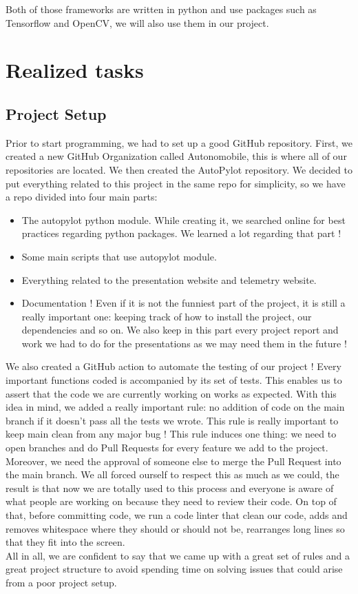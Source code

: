 \documentclass[12pt]{article}
\begin{document}
Both of those frameworks are written in python and use packages such as Tensorflow and OpenCV, we will also use them in our project.
\newpage



\section{Realized tasks}

\subsection{Project Setup}
Prior to start programming, we had to set up a good GitHub repository. First, we created a new GitHub Organization called Autonomobile, this is where all of our repositories are located. We then created the AutoPylot repository. We decided to put everything related to this project in the same repo for simplicity, so we have a repo divided into four main parts:
\begin{itemize}
\item The autopylot python module. While creating it, we searched online for best practices regarding python packages. We learned a lot regarding that part !
\item Some main scripts that use autopylot module.
\item Everything related to the presentation website and telemetry website.
\item Documentation ! Even if it is not the funniest part of the project, it is still a really important one: keeping track of how to install the project, our dependencies and so on. We also keep in this part every project report and work we had to do for the presentations as we may need them in the future !
\end{itemize}
We also created a GitHub action to automate the testing of our project ! Every important functions coded is accompanied by its set of tests. This enables us to assert that the code we are currently working on works as expected. With this idea in mind, we added a really important rule: no addition of code on the main branch if it doesn't pass all the tests we wrote. This rule is really important to keep main clean from any major bug ! This rule induces one thing: we need to open branches and do Pull Requests for every feature we add to the project. Moreover, we need the approval of someone else to merge the Pull Request into the main branch. We all forced ourself to respect this as much as we could, the result is that now we are totally used to this process and everyone is aware of what people are working on because they need to review their code.
On top of that, before committing code, we run a code linter that clean our code, adds and removes whitespace where they should or should not be, rearranges long lines so that they fit into the screen. \\
All in  all, we are confident to say that we came up with a great set of rules and a great project structure to avoid spending time on solving issues that could arise from a poor project setup.
\end{document}
